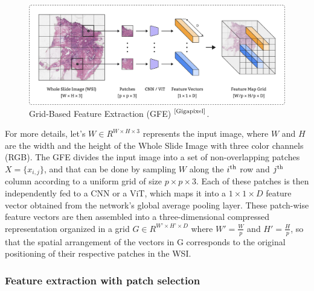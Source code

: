 \documentclass[
11pt, %
english, %
singlespacing, %
headsepline, %
]{project_structure}
\begin{document}
\begin{figure}[H]
    \centering
    \includegraphics[width=\textwidth]{figures/ABNN_methods/GFE.png}
    \caption{Grid-Based Feature Extraction (\acrshort{GFE}) $^{\text{\cite{Gigapixel}}}$.}
    \label{fig:gfe_stage}
\end{figure}

\noindent For more details, let’s $W \in R^{W \times H \times 3}$ represents the input image, where $W$ and $H$ are the width and the height of the Whole Slide Image with three color channels (RGB). The \acrshort{GFE} divides the input image into a set of non-overlapping patches $X = \{x_{i,j}\}$, and that can be done by sampling $W$ along the $i\textsuperscript{th}$ row and $j\textsuperscript{th}$ column according to a uniform grid of size $p \times p \times 3$. Each of these patches is then independently fed to a \acrshort{CNN} or a \acrshort{ViT}, which maps it into a $1 \times 1 \times D$ feature vector obtained from the network's global average pooling layer. These patch-wise feature vectors are then assembled into a three-dimensional compressed representation organized in a grid $G \in R^{W’ \times H’ \times D}$ where $W' = \frac{W}{p}$ and $H' = \frac{H}{p}$, so that the spatial arrangement of the vectors in G corresponds to the original positioning of their respective patches in the \acrshort{WSI}.

\subsubsection{Feature extraction with patch selection}
\end{document}
